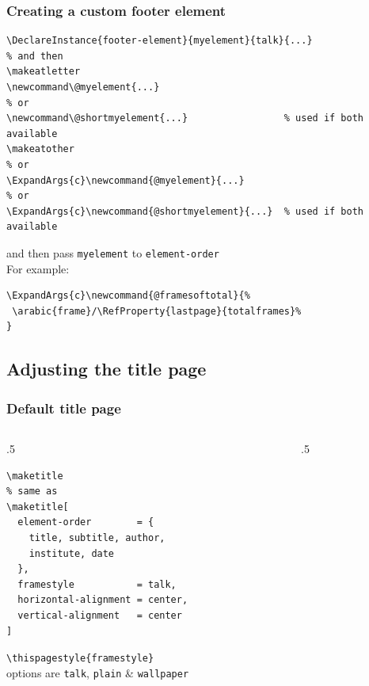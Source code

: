 \documentclass{ltx-talk}
\newcommand{\cs}[1]{\texttt{\textbackslash #1}}
\newcommand{\tubbraced}[1]{\texttt{\{#1\}}}
\begin{document}
\begin{frame*}
\frametitle{Creating a custom footer element}
\begin{lstlisting}
\DeclareInstance{footer-element}{myelement}{talk}{...}
% and then
\makeatletter
\newcommand\@myelement{...}
% or
\newcommand\@shortmyelement{...}                 % used if both available
\makeatother
% or
\ExpandArgs{c}\newcommand{@myelement}{...}
% or
\ExpandArgs{c}\newcommand{@shortmyelement}{...}  % used if both available
\end{lstlisting}\bigskip
and then pass \texttt{myelement} to \texttt{element-order}\\
For example:
\begin{lstlisting}
\ExpandArgs{c}\newcommand{@framesoftotal}{%
 \arabic{frame}/\RefProperty{lastpage}{totalframes}%
}
\end{lstlisting}
\end{frame*}

\subsection{Adjusting the title page}

\begin{frame*}
\frametitle{Default title page}
\begin{columns}
\begin{column}{.5\textwidth}
\begin{lstlisting}
\maketitle
% same as
\maketitle[
  element-order        = {
    title, subtitle, author,
    institute, date
  },
  framestyle           = talk,
  horizontal-alignment = center,
  vertical-alignment   = center
]
\end{lstlisting}
\cs{thispagestyle}\tubbraced{framestyle}\\
options are \texttt{talk}, \texttt{plain} \& \texttt{wallpaper}
\end{column}
\begin{column}{.5\textwidth}
\maketitle
\end{column}
\end{columns}
\end{frame*}
\end{document}
